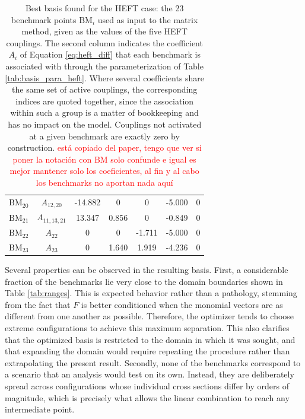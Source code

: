 \begin{table}
\begin{tabular}{l|c|c|c|c|c|c}
      $\mathrm{BM}_{20}$ & $A_{12,20}$    & -14.882 & 0      & 0      & -5.000 & 0 \\
      $\mathrm{BM}_{21}$ & $A_{11,13,21}$ & 13.347  & 0.856  & 0      & -0.849 & 0 \\
      $\mathrm{BM}_{22}$ & $A_{22}$       & 0       & 0      & -1.711 & -5.000 & 0 \\
      $\mathrm{BM}_{23}$ & $A_{23}$       & 0       & 1.640  & 1.919  & -4.236 & 0 \\
    \end{tabular}
    \caption{Best basis found for the HEFT case: the 23 benchmark points $\mathrm{BM}_i$
    used as input to the matrix method, given as the values of the five HEFT couplings.
    The second column indicates the coefficient $A_i$ of Equation \ref{eq:heft_diff} that each benchmark is associated with through the parameterization of Table \ref{tab:basis_para_heft}. Where several coefficients share the same set of
    active couplings, the corresponding indices are quoted together, since the association within such a group is a matter of bookkeeping and has no impact on the model. Couplings not activated at a given benchmark are exactly zero by construction. \textcolor{red}{está copiado del paper, tengo que ver si poner la notación con BM solo confunde e igual es mejor mantener solo los coeficientes, al fin y al cabo los benchmarks no aportan nada aquí}}
    \label{tab:bestheft}
\end{table}


%
\medskip
Several properties can be observed in the resulting basis. First, a considerable fraction of the benchmarks lie very close to the domain boundaries shown in Table \ref{tab:ranges}. This is expected behavior rather than a pathology, stemming from the fact that $F$ is better conditioned when the monomial vectors are as different from one another as possible. Therefore, the optimizer tends to choose extreme configurations to achieve this maximum separation. This also clarifies that the optimized basis is restricted to the domain in which it was sought, and that expanding the domain would require repeating the procedure rather than extrapolating the present result. Secondly, none of the benchmarks correspond to a scenario that an analysis would test on its own. Instead, they are deliberately spread across configurations whose individual cross sections differ by orders of magnitude, which is precisely what allows the linear combination to reach any intermediate point.

